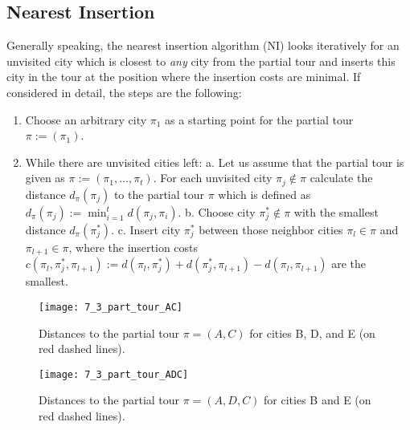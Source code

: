 \subsection{Nearest Insertion}
\label{subsec:ni}

Generally speaking, the nearest insertion algorithm (NI) looks iteratively for an unvisited city which is closest to \textit{any} city from the partial tour and inserts this city in the tour at the position where the insertion costs are minimal. If considered in detail, the steps are the following:

\begin{enumerate}
	\item Choose an arbitrary city $\pi_{1}$ as a starting point for the partial tour $\pi:= (\pi_{1})$.
	\item While there are unvisited cities left: 
	\subitem a. Let us assume that the partial tour is given as $\pi:= (\pi_{1}, ..., \pi_{t})$. For each unvisited city $\pi_{j} \notin \pi$ calculate the distance $d_{\pi}(\pi_{j})$ to the partial tour $\pi$ which is defined as $d_{\pi}(\pi_{j}) := \min _{i = 1}^{t}d({\pi_{j}, \pi_{i}})$.
	\subitem b. Choose city $\pi_{j}^{*} \notin \pi$ with the smallest distance $d_{\pi}(\pi_{j}^{*} )$.
	\subitem c. Insert city $\pi_{j}^{*}$ between those neighbor cities $\pi_{l} \in \pi$ and $\pi_{l + 1} \in \pi$, where the insertion costs $c(\pi_{l}, \pi_{j}^{*}, \pi_{l + 1}) := d(\pi_{l}, \pi_{j}^{*}) + d(\pi_{j}^{*}, \pi_{l + 1}) - d(\pi_{l}, \pi_{l + 1})$ are the smallest.
\end{enumerate}

\begin{figure}[htp] \centering
	\centering
	\texttt{[image: 7\_3\_part\_tour\_AC]}
	\caption{Distances to the partial tour $\pi = (A, C)$ for cities B, D, and E (on red dashed lines).}
	\label{7_3_part_tour_AC}
\end{figure}

\begin{figure}[htp] \centering
	\centering
	\texttt{[image: 7\_3\_part\_tour\_ADC]}
	\caption{Distances to the partial tour $\pi = (A, D, C)$ for cities B and E (on red dashed lines).}
	\label{7_3_part_tour_ADC}
\end{figure}

